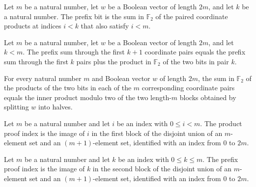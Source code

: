 \begin{definition}
\label{FABL.innerProductPrefixBit}
\leanok
{}
Let $m$ be a natural number, let $w$ be a Boolean vector of length $2m$, and let $k$ be
a natural number. The prefix bit is the sum in $\mathbb{F}_2$ of the paired coordinate
products at indices $i<k$ that also satisfy $i<m$.
\end{definition}

\begin{theorem}
\label{FABL.innerProductPrefixBit_succ}
\leanok
{}
Let $m$ be a natural number, let $w$ be a Boolean vector of length $2m$, and let $k<m$.
The prefix sum through the first $k+1$ coordinate pairs equals the prefix sum through
the first $k$ pairs plus the product in $\mathbb{F}_2$ of the two bits in pair $k$.
\end{theorem}

\begin{theorem}
\label{FABL.innerProductPrefixBit_full}
\leanok
{}
For every natural number $m$ and Boolean vector $w$ of length $2m$, the sum in
$\mathbb{F}_2$ of the products of the two bits in each of the $m$ corresponding
coordinate pairs equals the inner product modulo two of the two length-$m$ blocks
obtained by splitting $w$ into halves.
\end{theorem}

\begin{definition}
\label{FABL.innerProductProductProofIndex}
\leanok
Let $m$ be a natural number and let $i$ be an index with $0\le i<m$. The product proof
index is the image of $i$ in the first block of the disjoint union of an $m$-element set
and an $(m+1)$-element set, identified with an index from $0$ to $2m$.
\end{definition}

\begin{definition}
\label{FABL.innerProductPrefixProofIndex}
\leanok
Let $m$ be a natural number and let $k$ be an index with $0\le k\le m$. The prefix proof
index is the image of $k$ in the second block of the disjoint union of an $m$-element
set and an $(m+1)$-element set, identified with an index from $0$ to $2m$.
\end{definition}

